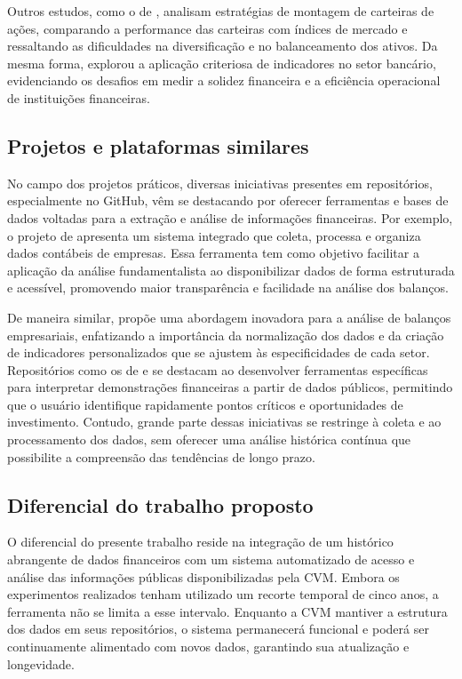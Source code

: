 \documentclass[recuosum=1.5cm]{iftex2024}
\begin{document}
Outros estudos, como o de \citet{vieira:2019:montagem}, analisam estratégias de montagem de carteiras de ações, comparando a performance das carteiras com índices de mercado e ressaltando as dificuldades na diversificação e no balanceamento dos ativos. Da mesma forma, \citet{freitas:2020:analise} explorou a aplicação criteriosa de indicadores no setor bancário, evidenciando os desafios em medir a solidez financeira e a eficiência operacional de instituições financeiras.

\subsection{Projetos e plataformas similares}

No campo dos projetos práticos, diversas iniciativas presentes em repositórios, especialmente no GitHub, vêm se destacando por oferecer ferramentas e bases de dados voltadas para a extração e análise de informações financeiras. Por exemplo, o projeto de \citet{paiva:2025:projetoGitHub} apresenta um sistema integrado que coleta, processa e organiza dados contábeis de empresas. Essa ferramenta tem como objetivo facilitar a aplicação da análise fundamentalista ao disponibilizar dados de forma estruturada e acessível, promovendo maior transparência e facilidade na análise dos balanços.

De maneira similar, \citet{minas:2025:projetoGitHub} propõe uma abordagem inovadora para a análise de balanços empresariais, enfatizando a importância da normalização dos dados e da criação de indicadores personalizados que se ajustem às especificidades de cada setor. Repositórios como os de \citet{fontinele:2025:projetoGitHub} e \citet{louredo:2025:projetoGitHub} se destacam ao desenvolver ferramentas específicas para interpretar demonstrações financeiras a partir de dados públicos, permitindo que o usuário identifique rapidamente pontos críticos e oportunidades de investimento. Contudo, grande parte dessas iniciativas se restringe à coleta e ao processamento dos dados, sem oferecer uma análise histórica contínua que possibilite a compreensão das tendências de longo prazo.

\subsection{Diferencial do trabalho proposto}

O diferencial do presente trabalho reside na integração de um histórico abrangente de dados financeiros com um sistema automatizado de acesso e análise das informações públicas disponibilizadas pela CVM. Embora os experimentos realizados tenham utilizado um recorte temporal de cinco anos, a ferramenta não se limita a esse intervalo. Enquanto a CVM mantiver a estrutura dos dados em seus repositórios, o sistema permanecerá funcional e poderá ser continuamente alimentado com novos dados, garantindo sua atualização e longevidade.
\end{document}
